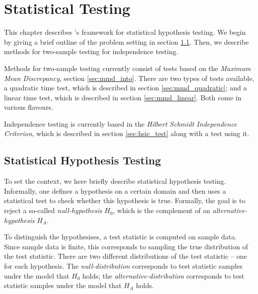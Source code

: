 %

\chapter{Statistical Testing}
This chapter describes \shogun{}'s framework for statistical hypothesis testing. We begin by giving a brief outline of the problem setting in section \ref{sec:hypothesis_testing_into}. Then, we describe methods for two-sample testing for independence testing.

Methods for two-sample testing currently consist of tests based on the \emph{Maximum Mean Discrepancy}, section \ref{sec:mmd_into}. There are two types of tests available, a quadratic time test, which is described in section \ref{sec:mmd_quadratic}; and a linear time test, which is described in section \ref{sec:mmd_linear}. Both come in various flavours.

Independence testing is currently based in the \emph{Hilbert Schmidt Independence Criterion}, which is described in section \ref{sec:hsic_test} along with a test using it.

\section{Statistical Hypothesis Testing}
\label{sec:hypothesis_testing_into}

To set the context, we here briefly describe statistical hypothesis testing. Informally, one defines a hypothesis on a certain domain and then uses a statistical test to check whether this hypothesis is true. Formally, the goal is to reject a so-called \emph{null-hypothesis} $H_0$, which is the complement of an \emph{alternative-hypothesis} $H_A$. 

To distinguish the hypothesises, a test statistic is computed on sample data. Since sample data is finite, this corresponds to sampling the true distribution of the test statistic. There are two different distributions of the test statistic -- one for each hypothesis. The \emph{null-distribution} corresponds to test statistic samples under the model that $H_0$ holds; the \emph{alternative-distribution} corresponds to test statistic samples under the model that $H_A$ holds.

